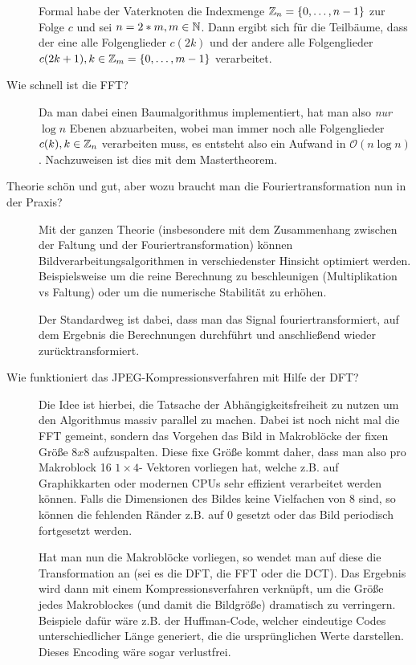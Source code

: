 \begin{description}
      Formal habe der Vaterknoten die Indexmenge $\mathbb{Z}_n = \{0,\ldots,n-1\}$ zur Folge $c$ und sei $n=2*m, m\in\mathbb{N}$.
      Dann ergibt sich für die Teilbäume, dass der eine alle Folgenglieder $c(2k)$ und der andere alle Folgenglieder
      $c(2k+1), k \in \mathbb{Z}_m = \{0,\ldots,m-1\}$ verarbeitet.
	\item[Wie schnell ist die FFT?]
      Da man dabei einen Baumalgorithmus implementiert, hat man also \emph{nur} $\log n$ Ebenen abzuarbeiten, wobei
      man immer noch alle Folgenglieder $c(k),k\in\mathbb{Z}_n$ verarbeiten muss, es entsteht also ein Aufwand 
      in $\mathcal{O}(n \log n)$. Nachzuweisen ist dies mit dem Mastertheorem.
    \item[Theorie schön und gut, aber wozu braucht man die Fouriertransformation nun in der Praxis?]
      Mit der ganzen Theorie (insbesondere mit dem Zusammenhang zwischen der Faltung und der Fouriertransformation)
      können Bildverarbeitungsalgorithmen in verschiedenster Hinsicht optimiert werden. Beispielsweise
      um die reine Berechnung zu beschleunigen (Multiplikation vs Faltung) oder um die numerische Stabilität
      zu erhöhen.

      Der Standardweg ist dabei, dass man das Signal fouriertransformiert, auf dem Ergebnis die Berechnungen
      durchführt und anschließend wieder zurücktransformiert.
	\item[Wie funktioniert das JPEG-Kompressionsverfahren mit Hilfe der DFT?]
      Die Idee ist hierbei, die Tatsache der Abhängigkeitsfreiheit zu nutzen um den Algorithmus massiv parallel
      zu machen. Dabei ist noch nicht mal die FFT gemeint, sondern das Vorgehen das Bild in Makroblöcke der
      fixen Größe $8x8$ aufzuspalten. Diese fixe Größe kommt daher, dass man also pro Makroblock 16 $1\times 4$-
      Vektoren vorliegen hat, welche z.B. auf Graphikkarten oder modernen CPUs sehr effizient verarbeitet werden
      können. Falls die Dimensionen des Bildes keine Vielfachen von $8$ sind, so können die fehlenden Ränder
      z.B. auf $0$ gesetzt oder das Bild periodisch fortgesetzt werden.

      Hat man nun die Makroblöcke vorliegen, so wendet man auf diese die Transformation an (sei es die DFT, die
      FFT oder die DCT). Das Ergebnis wird dann mit einem Kompressionsverfahren verknüpft, um die Größe jedes
      Makroblockes (und damit die Bildgröße) dramatisch zu verringern. Beispiele dafür wäre z.B. der Huffman-Code,
      welcher eindeutige Codes unterschiedlicher Länge generiert, die die ursprünglichen Werte darstellen. Dieses
      Encoding wäre sogar verlustfrei.


\end{description}
